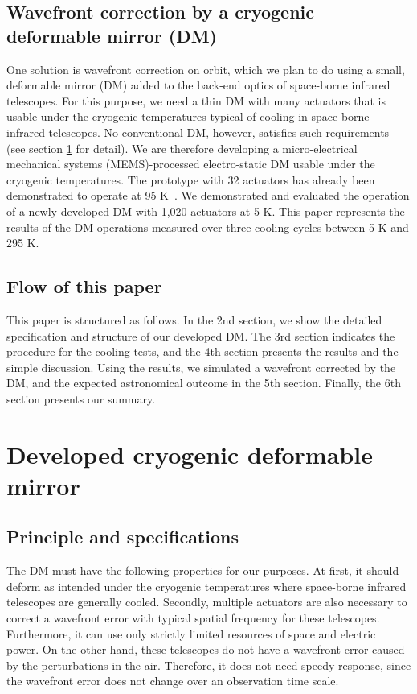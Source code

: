 \documentclass[a4paper]{article}
\begin{document}
\subsection{Wavefront correction by a cryogenic deformable mirror (DM)}

One solution is wavefront correction on orbit, which we plan to do using a small, deformable mirror (DM) added to the back-end optics of space-borne infrared telescopes. For this purpose, we need a thin DM with many actuators that is usable under the cryogenic temperatures typical of cooling in space-borne infrared telescopes. No conventional DM, however, satisfies such requirements (see section \ref{DM} for detail). We are therefore developing a micro-electrical mechanical systems (MEMS)-processed electro-static DM usable under the cryogenic temperatures. The prototype with 32 actuators has already been demonstrated to operate at 95 K~\cite{95K_DM}. We demonstrated and evaluated the operation of a newly developed DM with 1,020 actuators at 5 K. This paper represents the results of the DM operations measured over three cooling cycles between 5 K and 295 K.

\subsection{Flow of this paper}

This paper is structured as follows. In the 2nd section, we show the detailed specification and structure of our developed DM. The 3rd section indicates the procedure for the cooling tests, and the 4th section presents the results and the simple discussion. Using the results, we simulated a wavefront corrected by the DM, and the expected astronomical outcome in the 5th section. Finally, the 6th section presents our summary.


\section{Developed cryogenic deformable mirror}
\label{DM}

\subsection{Principle and specifications}
The DM must have the following properties for our purposes. At first, it should deform as intended under the cryogenic temperatures where space-borne infrared telescopes are generally cooled. Secondly, multiple actuators are also necessary to correct a wavefront error with typical spatial frequency for these telescopes. Furthermore, it can use only strictly limited resources of space and electric power. On the other hand, these telescopes do not have a wavefront error caused by the perturbations in the air. Therefore, it does not need speedy response, since the wavefront error does not change over an observation time scale.
\end{document}
